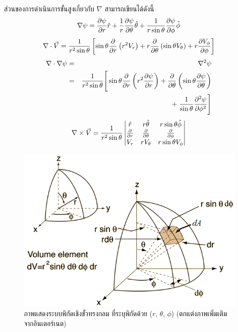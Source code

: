 ส่วนของการดำเนินการขั้นสูงเกี่ยวกับ $\nabla$ สามารถเขียนได้ดังนี้
\begin{equation}\label{SphereCoorGrad}
\nabla\psi = \frac{\partial\psi}{\partial r}\hat{r} + \frac{1}{r}\frac{\partial\psi}{\partial\theta}\hat{\theta} + \frac{1}{r \sin\theta}\frac{\partial\psi}{\partial\phi}\hat{\phi}
\end{equation}
\begin{equation}\label{SphereCoorDiv}
\nabla\cdot\vec{V} = \frac{1}{r^2 \sin\theta}\left[\sin\theta\frac{\partial}{\partial r}\left(r^2V_r\right) + r\frac{\partial}{\partial\theta}\left(\sin\theta V_\theta\right) + r\frac{\partial V_\phi}{\partial\phi}\right]
\end{equation}
\begin{eqnarray}\label{SphereCoorLaplace}
\nabla\cdot\nabla\psi &=& \nabla^2\psi \nonumber \\
        &=& \frac{1}{r^2 \sin\theta}\Bigg[\sin\theta\frac{\partial}{\partial r}\left(r^2\frac{\partial\psi}{\partial r}\right) + \frac{\partial}{\partial\theta}\left(\sin\theta\frac{\partial\psi}{\partial\theta}\right) \nonumber \\
        & & +\;\frac{1}{\sin\theta}\frac{\partial^2\psi}{\partial\phi^2}\Bigg]
\end{eqnarray}
\begin{equation}\label{SphereCoorCurl}
\nabla\times\vec{V} = \frac{1}{r^2 \sin\theta}\begin{vmatrix} \hat{r} & r\hat{\theta} & r \sin\theta\hat{\phi} \\ \frac{\partial}{\partial r} & \frac{\partial}{\partial\theta} & \frac{\partial}{\partial\phi} \\ V_r & rV_\theta & r \sin\theta V_\phi \end{vmatrix}
\end{equation}

\begin{figure}[!h]%
\centering
\includegraphics[width=0.75\columnwidth]{sphcoordel.png}
\caption{ภาพแสดงระบบพิกัดเชิงขั้วทรงกลม ที่ระบุพิกัดด้วย ($r$, $\theta$, $\phi$) (ตกแต่งภาพเพิ่มเติมจากอินเตอร์เนต)}
\label{fig7}
\end{figure}


